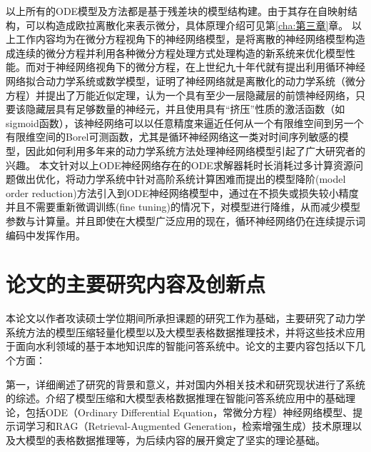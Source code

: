 以上所有的ODE模型及方法都是基于残差块\cite{weinan2017proposal}的模型结构建。由于其存在自映射结构，可以构造成欧拉离散化来表示微分，具体原理介绍可见第\ref{cha:第三章}章。
以上工作内容均为在微分方程视角下的神经网络模型，是将离散的神经网络模型构造成连续的微分方程并利用各种微分方程处理方式处理构造的新系统来优化模型性能。而对于神经网络视角下的微分方程，在上世纪九十年代就有提出利用循环神经网络拟合动力学系统或数学模型\cite{cybenko1989approximation,li2022deep,cao2018brits,pearlmutter1989learning,neil2016phased,che2018recurrent}，证明了神经网络就是离散化的动力学系统（微分方程）并提出了万能近似定理，认为一个具有至少一层隐藏层的前馈神经网络，只要该隐藏层具有足够数量的神经元，并且使用具有“挤压”性质的激活函数（如sigmoid函数），该神经网络可以以任意精度来逼近任何从一个有限维空间到另一个有限维空间的Borel可测函数，尤其是循环神经网络这一类对时间序列敏感的模型，因此如何利用多年来的动力学系统方法处理神经网络模型引起了广大研究者的兴趣。
本文针对以上ODE神经网络存在的ODE求解器耗时长消耗过多计算资源问题做出优化，将动力学系统中针对高阶系统计算困难而提出的模型降阶(model order reduction)方法引入到ODE神经网络模型中，通过在不损失或损失较小精度并且不需要重新微调训练(fine tuning)的情况下，对模型进行降维，从而减少模型参数与计算量。并且即使在大模型广泛应用的现在，循环神经网络仍在连续提示词编码中发挥作用。


\section{论文的主要研究内容及创新点}
本论文以作者攻读硕士学位期间所承担课题的研究工作为基础，主要研究了动力学系统方法的模型压缩轻量化模型以及大模型表格数据推理技术，并将这些技术应用于面向水利领域的基于本地知识库的智能问答系统中。论文的主要内容包括以下几个方面： 

第一，详细阐述了研究的背景和意义，并对国内外相关技术和研究现状进行了系统的综述。介绍了模型压缩和大模型表格数据推理在智能问答系统应用中的基础理论，包括ODE（Ordinary Differential Equation，常微分方程）神经网络模型、提示词学习和RAG（Retrieval-Augmented Generation，检索增强生成）技术原理以及大模型的表格数据推理等，为后续内容的展开奠定了坚实的理论基础。 

